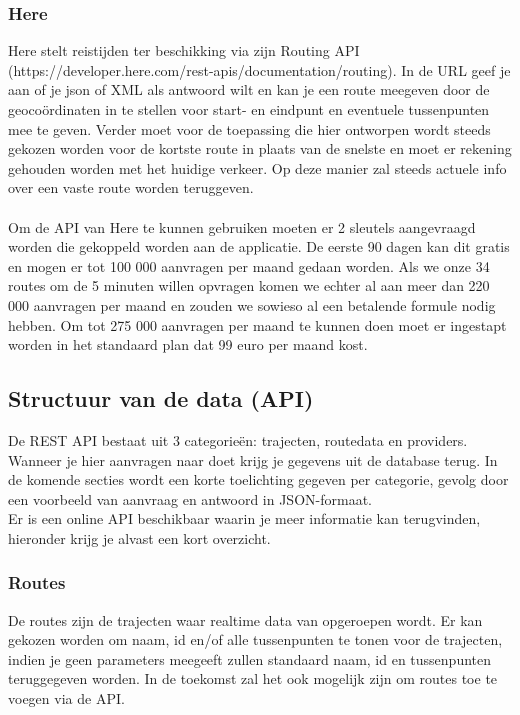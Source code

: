 \documentclass[ps,a4paper,oneside]{report}
\begin{document}
\subsubsection{Here}
Here stelt reistijden ter beschikking via zijn Routing API \\(https://developer.here.com/rest-apis/documentation/routing). In de URL geef je aan of je json of XML als antwoord wilt en kan je een route meegeven door de geoco\"ordinaten in te stellen voor start- en eindpunt en eventuele tussenpunten mee te geven. Verder moet voor de toepassing die hier ontworpen wordt steeds gekozen worden voor de kortste route in plaats van de snelste en moet er rekening gehouden worden met het huidige verkeer. Op deze manier zal steeds actuele info over een vaste route worden teruggeven.\\\\
Om de API van Here te kunnen gebruiken moeten er 2 sleutels aangevraagd worden die gekoppeld worden aan de applicatie. De eerste 90 dagen kan dit gratis en mogen er tot 100 000 aanvragen per maand gedaan worden. Als we onze 34 routes om de 5 minuten willen opvragen komen we echter al aan meer dan 220 000 aanvragen per maand en zouden we sowieso al een betalende formule nodig hebben. Om tot 275 000 aanvragen per maand te kunnen doen moet er ingestapt worden in het standaard plan dat 99 euro per maand kost.\\
\subsection{Structuur van de data (API)}
De REST API bestaat uit 3 categorie\"en: trajecten, routedata en providers. Wanneer je hier aanvragen naar doet krijg je gegevens uit de database terug. In de komende secties wordt een korte toelichting gegeven per categorie, gevolg door een voorbeeld van aanvraag en antwoord in JSON-formaat. \\Er is een online API beschikbaar waarin je meer informatie kan terugvinden, hieronder krijg je alvast een kort overzicht.

\subsubsection{Routes}
De routes zijn de trajecten waar realtime data van opgeroepen wordt. Er kan gekozen worden om naam, id en/of alle tussenpunten te tonen voor de trajecten, indien je geen parameters meegeeft zullen standaard naam, id en tussenpunten teruggegeven worden. In de toekomst zal het ook mogelijk zijn om routes toe te voegen via de API.\\
\end{document}
